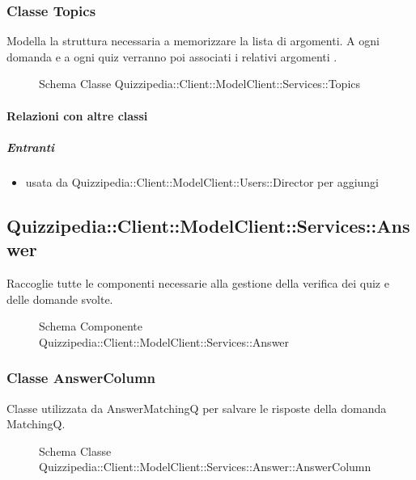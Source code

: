 \subsubsection{Classe Topics}
Modella la struttura necessaria a memorizzare la lista di argomenti. A ogni domanda e a ogni quiz verranno poi associati i relativi argomenti .
\begin{figure}[H]
\centering
\noindent{}
\caption[Schema Classe Topics]{Schema Classe Quizzipedia::Client::ModelClient::Services::Topics}
\end{figure}
\paragraph{Relazioni con altre classi}
\subparagraph{Entranti}
\begin{itemize}
\item usata da Quizzipedia::Client::ModelClient::Users::Director per aggiungi
\end{itemize}
\subsection{Quizzipedia::Client::ModelClient::Services::Answer}
Raccoglie tutte le componenti necessarie alla gestione della verifica dei quiz e delle domande svolte.
\begin{figure}[H]
\centering
\noindent{}
\caption[Schema Componente Quizzipedia::Client::ModelClient::Services::Answer]{Schema Componente Quizzipedia::Client::ModelClient::Services::Answer}
\end{figure}
\subsubsection{Classe AnswerColumn}
Classe utilizzata da AnswerMatchingQ per salvare le risposte della domanda MatchingQ.
\begin{figure}[H]
\centering
\noindent{}
\caption[Schema Classe AnswerColumn]{Schema Classe Quizzipedia::Client::ModelClient::Services::Answer::AnswerColumn}
\end{figure}
